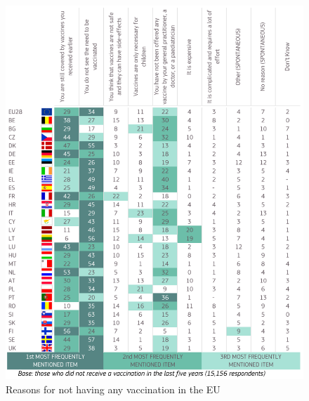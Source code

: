 \documentclass[12pt,a4paper,twoside]{article}
\begin{document}
\begin{figure}%
	\centering %
	\def\svgwidth{75pt}
	\caption{Reasons for not having any vaccination in the EU
	\label{fig:vaccine_mistrust_eu} \cite{KantarBelgium2019}}
	\includegraphics[scale=0.5]{img/vaccine_hesitancy_EU_MULTIPLE_ANSWERS.png}
\end{figure}

\newpage
\end{document}
